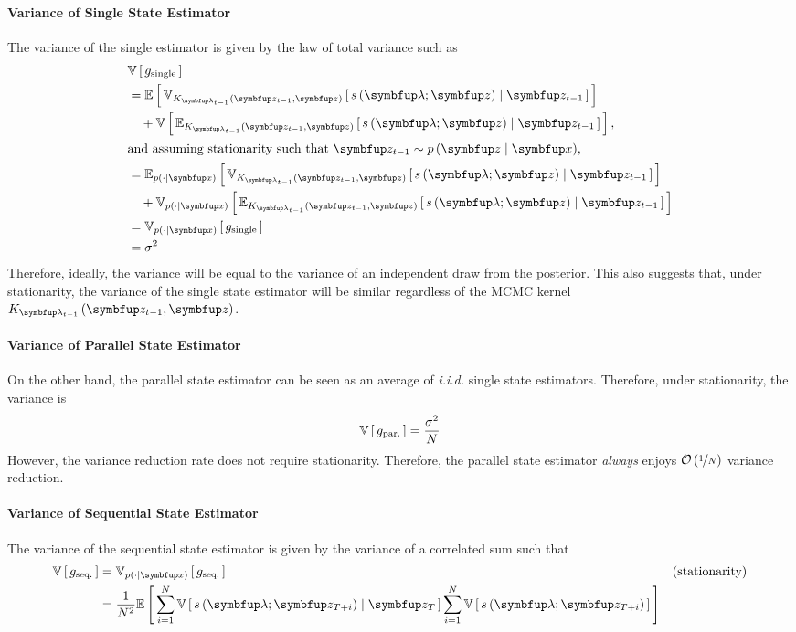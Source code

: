 \paragraph{Variance of Single State Estimator}
The variance of the single estimator is given by the law of total variance such as
\begin{align}
  &\V{g_{\text{single}}} \nonumber \\
  &= \E{ \Vsub{K_{\vlambda_{t-1}}\left(\vz_{t-1}, \vz\right)}{ s\left(\vlambda; \vz\right) \mid \vz_{t-1} }} \nonumber \\
  &\quad + \V{ \Esub{K_{\vlambda_{t-1}}\left(\vz_{t-1}, \vz\right)}{ s\left(\vlambda; \vz\right) \mid \vz_{t-1} } }, \\
  \intertext{and assuming stationarity such that \(\vz_{t-1} \sim p\left(\vz \mid \vx\right)\),}
  &= \Esub{p\left(\cdot \mid\vx \right)}{ \Vsub{K_{\vlambda_{t-1}}\left(\vz_{t-1}, \vz\right)}{ s\left(\vlambda; \vz\right) \mid \vz_{t-1} }} \nonumber\\
  &\quad + \Vsub{p\left(\cdot \mid\vx \right)}{ \Esub{K_{\vlambda_{t-1}}\left(\vz_{t-1}, \vz\right)}{ s\left(\vlambda; \vz\right) \mid \vz_{t-1} } } \\
  &= \Vsub{p\left(\cdot\mid\vx \right)}{g_{\text{single}}} \\
  &= \sigma^2
\end{align}
Therefore, ideally, the variance will be equal to the variance of an independent draw from the posterior.
This also suggests that, under stationarity, the variance of the single state estimator will be similar regardless of the MCMC kernel \(K_{\vlambda_{t-1}}\left(\vz_{t-1}, \vz\right)\).

\paragraph{Variance of Parallel State Estimator}
On the other hand, the parallel state estimator can be seen as an average of \textit{i.i.d.} single state estimators.
Therefore, under stationarity, the variance is
\begin{align}
  \mathbb{V}\left[\,g_{\text{par.}}\,\right] = \frac{\sigma^2}{N}
\end{align}
However, the variance reduction rate does not require stationarity.
Therefore, the parallel state estimator \textit{always} enjoys \(\mathcal{O}\left(\nicefrac{1}{N}\right)\) variance reduction.

\paragraph{Variance of Sequential State Estimator}
The variance of the sequential state estimator is given by the variance of a correlated sum such that
\begin{align}
  \V{g_{\text{seq.}}} &= \Vsub{p\left(\cdot\mid\vx\right)}{g_{\text{seq.}}} &\text{(stationarity)} \\
  &= \frac{1}{N^2} \E{ \sum_{i=1}^N \V{ s\left(\vlambda; \vz_{T+i} \right) \mid \vz_{T}}
     \sum_{i=1}^N \V{ s\left(\vlambda; \vz_{T+i} \right) }}
\end{align}

%
%
%

%

